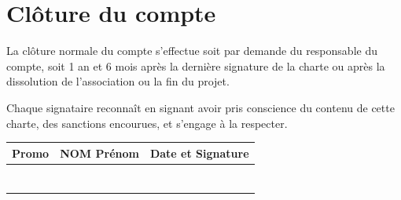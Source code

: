\documentclass[11pt, a4paper]{article}
\begin{document}
\section{Clôture du compte}
La clôture normale du compte s'effectue soit par demande du responsable du compte, soit 1 an et 6 mois après la dernière signature de la charte ou après la dissolution de l'association ou la fin du projet.

\vspace{.5cm}

\noindent Chaque signataire reconnaît en signant avoir pris conscience du contenu de cette charte, des sanctions encourues, et s'engage à la respecter.

\begin{table}[h]
	\centering
	\renewcommand{\arraystretch}{2}
	\small{
		\begin{tabular}{|p{1.5cm}|p{7cm}|p{7cm}|}
			\hline
			\rowcolor{black!10} Promo & NOM Prénom & Date et Signature \\
			\hline
			                          &            &                   \\
			\hline
			                          &            &                   \\
			\hline
			                          &            &                   \\
			\hline
			                          &            &                   \\
			\hline
			                          &            &                   \\
			\hline
			                          &            &                   \\
			\hline
			                          &            &                   \\
			\hline
		\end{tabular}
	}
\end{table}
\end{document}
